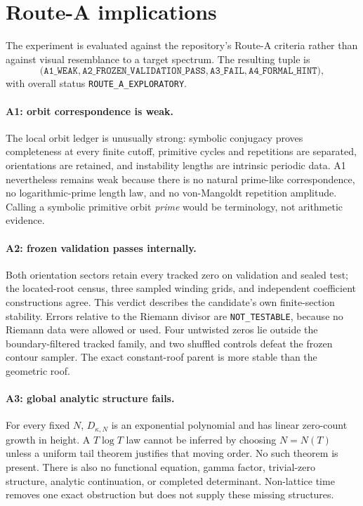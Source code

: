 \section{Route-A implications}
\label{sec:route-a}

The experiment is evaluated against the repository's Route-A criteria rather
than against visual resemblance to a target spectrum.  The resulting tuple is
\[
 \bigl(
 \texttt{A1\_WEAK},
 \texttt{A2\_FROZEN\_VALIDATION\_PASS},
 \texttt{A3\_FAIL},
 \texttt{A4\_FORMAL\_HINT}
 \bigr),
\]
with overall status \texttt{ROUTE\_A\_EXPLORATORY}.

\paragraph{A1: orbit correspondence is weak.}
The local orbit ledger is unusually strong: symbolic conjugacy proves
completeness at every finite cutoff, primitive cycles and repetitions are
separated, orientations are retained, and instability lengths are intrinsic
periodic data.  A1 nevertheless remains weak because there is no natural
prime-like correspondence, no logarithmic-prime length law, and no
von-Mangoldt repetition amplitude.  Calling a symbolic primitive orbit
\emph{prime} would be terminology, not arithmetic evidence.

\paragraph{A2: frozen validation passes internally.}
Both orientation sectors retain every tracked zero on validation and sealed
test; the located-root census, three sampled winding grids, and independent
coefficient constructions agree.  This verdict describes the candidate's own
finite-section stability.  Errors relative to the Riemann divisor are
\texttt{NOT\_TESTABLE}, because no Riemann data were allowed or used.  Four
untwisted zeros lie outside the boundary-filtered tracked family, and two
shuffled controls defeat the frozen contour sampler.  The exact constant-roof
parent is more stable than the geometric roof.

\paragraph{A3: global analytic structure fails.}
For every fixed \(N\), \(D_{\kappa,N}\) is an exponential polynomial and has
linear zero-count growth in height.  A \(T\log T\) law cannot be inferred by
choosing \(N=N(T)\) unless a uniform tail theorem justifies that moving order.
No such theorem is present.  There is also no functional equation, gamma
factor, trivial-zero structure, analytic continuation, or completed
determinant.  Non-lattice time removes one exact obstruction but does not
supply these missing structures.

